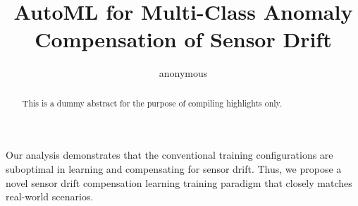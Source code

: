 \documentclass[preprint,12pt]{elsarticle}
\begin{document}
\begin{frontmatter}

\title{AutoML for Multi-Class Anomaly Compensation of Sensor Drift}

\author[anonymous]{anonymous}






\begin{abstract}
This is a dummy abstract for the purpose of compiling highlights only.
\end{abstract}

\begin{highlights}
Our analysis demonstrates that the conventional training configurations are suboptimal in learning and compensating for sensor drift. Thus, we propose a novel sensor drift compensation learning training paradigm that closely matches real-world scenarios.\\


\end{highlights}
\end{frontmatter}
\end{document}
